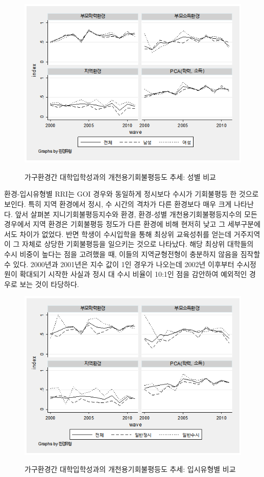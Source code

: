 \begin{figure}
    \centering
    \caption{가구환경간 대학입학성과의 개천용기회불평등도 추세: 성별 비교}
    \includegraphics[width=\textwidth]{figure/goms_rri_bysex.png}
    \label{fig:goms_rri_bysex}
\end{figure}

환경-입시유형별 RRI는 GOI 경우와 동일하게 정시보다 수시가 기회불평등 한 것으로 보인다.
특히 지역 환경에서 정시, 수 시간의 격차가 다른 환경보다 매우 크게 나타난다.
 앞서 살펴본 지니기회불평등지수와 환경, 환경-성별 개천용기회불평등지수의 모든 경우에서 지역 환경은 기회불평등 정도가 다른 환경에 비해 현저히 낮고 그 세부구분에서도 차이가 없었다.
 반면 학생이 수시입학을 통해 최상위 교육성취를 얻는데 거주지역이 그 자체로 상당한 기회불평등을 일으키는 것으로 나타났다.
 해당 최상위 대학들의 수시 비중이 높다는 점을 고려했을 때, 이들의 지역균형전형이 충분하지 않음을 짐작할 수 있다.
 2000년과 2001년은 지수 값이 1인 경우가 나오는데 2002년 이후부터 수시정원이 확대되기 시작한 사실과 정시 대 수시 비율이 10:1인 점을 감안하여 예외적인 경우로 보는 것이 타당하다.

\begin{figure}
    \centering
    \caption{가구환경간 대학입학성과의 개천용기회불평등도 추세: 입시유형별 비교}
    \includegraphics[width=\textwidth]{figure/goms_rri_byent.png}
    \label{fig:goms_rri_byent}
\end{figure}


